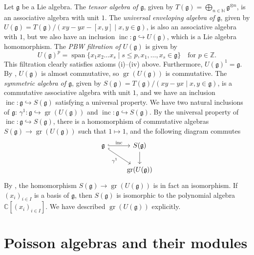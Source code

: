 \documentclass[a4paper, 12pt, reqno]{amsart}
\theoremstyle{remark}
\DeclareMathOperator{\gr}{gr}
\DeclareMathOperator{\vspan}{span}
\DeclareMathOperator{\inc}{inc}
\begin{document}
Let $\mathfrak{g}$ be a Lie algebra.
The \emph{tensor algebra of $\mathfrak{g}$}, given by $T(\mathfrak{g}) = \bigoplus_{n \in \mathbb{N}}\mathfrak{g}^{\otimes n}$, is an associative algebra with unit $1$.
The \emph{universal enveloping algebra of $\mathfrak{g}$}, given by $U(\mathfrak{g}) = T(\mathfrak{g})/(xy - yx - [x, y] \mid x, y \in \mathfrak{g})$, is also an associative algebra with $1$, but we also have an inclusion $\inc: \mathfrak{g} \hookrightarrow U(\mathfrak{g})$, which is a Lie algebra homomorphism.
The \emph{PBW filtration of $U(\mathfrak{g})$} is given by
\begin{equation*}
  U(\mathfrak{g})^p = \vspan\{x_1x_2\dots x_s \mid s \le p, x_1, \dots, x_s \in \mathfrak{g}\} \quad \text{for $p \in \mathbb{Z}$}.
\end{equation*}
This filtration clearly satisfies axioms (i)--(iv) above.
Furthermore, $U(\mathfrak{g})^1 = \mathfrak{g}$.
By \cite[Lemma 2.1.5]{dixmier_enveloping_1996}, $U(\mathfrak{g})$ is almost commutative, so $\gr(U(\mathfrak{g}))$ is commutative.
The \emph{symmetric algebra of $\mathfrak{g}$}, given by $S(\mathfrak{g}) = T(\mathfrak{g})/(xy - yx \mid x, y \in \mathfrak{g})$, is a commutative associative algebra with unit $1$, and we have an inclusion $\inc: \mathfrak{g} \hookrightarrow S(\mathfrak{g})$ satisfying a universal property.
We have two natural inclusions of $\mathfrak{g}$: $\gamma^1: \mathfrak{g} \hookrightarrow \gr(U(\mathfrak{g}))$ and $\inc: \mathfrak{g} \hookrightarrow S(\mathfrak{g})$.
By the universal property of $\inc: \mathfrak{g} \hookrightarrow S(\mathfrak{g})$, there is a homomorphism of commutative algebras $S(\mathfrak{g}) \to \gr(U(\mathfrak{g}))$ such that $1 \mapsto 1$, and the following diagram commutes
\begin{equation*}
  \begin{tikzcd}
    \mathfrak{g} \arrow[r, "\inc", hook] \arrow[rd, "\gamma^1"', hook] & S(\mathfrak{g}) \arrow[d] \\
    & \gr(U(\mathfrak{g}))
  \end{tikzcd}
\end{equation*}
By \cite[Proposition 2.3.6]{dixmier_enveloping_1996}, the homomorphism $S(\mathfrak{g}) \to \gr(U(\mathfrak{g}))$ is in fact an isomorphism.
If $(x_i)_{i \in I}$ is a basis of $\mathfrak{g}$, then $S(\mathfrak{g})$ is isomorphic to the polynomial algebra $\mathbb{C}[(x_i)_{i \in I}]$.
We have described $\gr(U(\mathfrak{g}))$ explicitly.

\section{Poisson algebras and their modules}
\label{sec:poiss-algebr-their-1}
\end{document}
